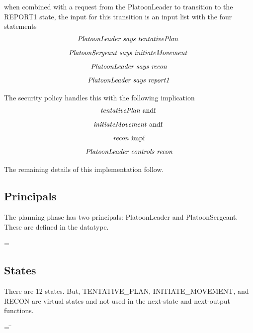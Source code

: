\documentclass[../../main/main.tex]{subfiles}
\begin{document}
when combined with a request from the PlatoonLeader to transition to the REPORT1 state, the input for this transition is an input list with the four statements
\[\text{\textit{PlatoonLeader says tentativePlan}  }\]
\[\text{\textit{PlatoonSergeant says initiateMovement}  }\]
\[\text{\textit{PlatoonLeader says recon}}\]
\[\text{\textit{PlatoonLeader says report1}}\]

The security policy handles this with the following implication
\[\text{\textit{tentativePlan} andf  }\]
\[\text{\textit{initiateMovement} andf  }\]
\[\text{\textit{recon} impf}\]
\[\text{\textit{PlatoonLeader controls recon}}\]

The remaining details of this implementation follow.
\subsection{Principals}
The planning phase  has two principals: PlatoonLeader and PlatoonSergeant.  These are defined in the  datatype.

 =  \HOLTokenBar{} 

\subsection{States}
There are 12 states.  But, TENTATIVE_PLAN, INITIATE_MOVEMENT, and RECON are virtual states and not used in the next-state and next-output functions.

\begin{tabbing}
\parskip=8pt
 = \= \\
				\>\HOLTokenBar{}  \\
				\>\HOLTokenBar{}  \\
				\>\HOLTokenBar{} \\
        				\>\HOLTokenBar{}  \\
				\>\HOLTokenBar{}  \\
				\>\HOLTokenBar{}  \\
				\>\HOLTokenBar{} \\
        				\>\HOLTokenBar{}  \\
				\>\HOLTokenBar{}  \\
				\>\HOLTokenBar{}  \\
				\>\HOLTokenBar{} 
\parskip=18pt
\end{tabbing}
\end{document}
